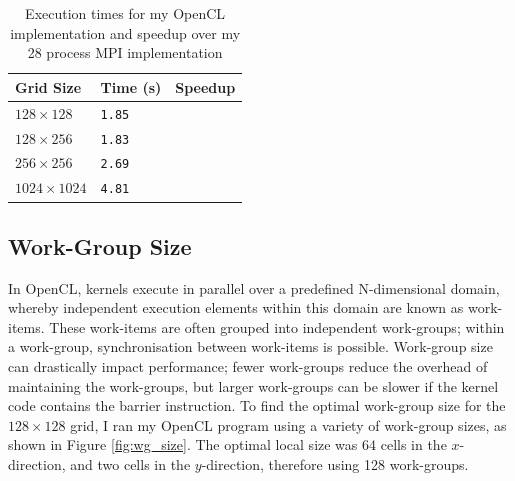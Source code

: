 \documentclass[twocolumn, a4paper]{article}
\begin{document}
\begin{table}[htbp]
  \begin{center}
  \caption{Execution times for my OpenCL implementation and speedup over my 28 process MPI implementation}\label{tab:OpenCL}
  \begin{tabular}[t]{l | l l} 
      \hline\hline
      Grid Size&Time (s)&Speedup\\
      \hline
      $128 \times 128$&\texttt{1.85}&\texttt{}\\
      $128 \times 256$&\texttt{1.83}&\texttt{}\\
      $256 \times 256$&\texttt{2.69}&\texttt{}\\
      $1024 \times 1024$&\texttt{4.81}&\texttt{}\\
      \hline
    \end{tabular}
  \end{center}
  \vspace{-1em}
\end{table}

\subsection{Work-Group Size}

In OpenCL, kernels execute in parallel over a predefined N-dimensional domain, whereby independent execution elements within this domain are known as work-items.
These work-items are often grouped into independent work-groups; within a work-group, synchronisation between work-items is possible.
Work-group size can drastically impact performance; fewer work-groups reduce the overhead of maintaining the work-groups, but larger work-groups can be slower if the kernel code contains the barrier instruction.
To find the optimal work-group size for the $128\times128$ grid, I ran my OpenCL program using a variety of work-group sizes, as shown in Figure \ref{fig:wg_size}.
The optimal local size was $64$ cells in the $x$-direction, and two cells in the $y$-direction, therefore using 128 work-groups.
\end{document}
